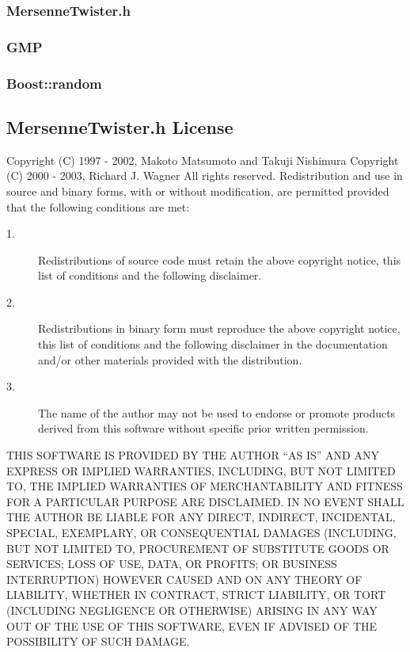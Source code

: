 \documentclass{scrartcl}
\begin{document}
\subsubsection{MersenneTwister.h}
\subsubsection{GMP}
\subsubsection{Boost::random}

\newpage
\begin{appendix}
\section{MersenneTwister.h License}
Copyright (C) 1997 - 2002, Makoto Matsumoto and Takuji Nishimura\newline
Copyright (C) 2000 - 2003, Richard J. Wagner\newline
All rights reserved.\newline
\newline
Redistribution and use in source and binary forms, with or without
modification, are permitted provided that the following conditions
are met:\newline
\begin{description}
\item[1.] Redistributions of source code must retain the above copyright\newline
   notice, this list of conditions and the following disclaimer.
\item[2.] Redistributions in binary form must reproduce the above copyright\newline
   notice, this list of conditions and the following disclaimer in the
   documentation and/or other materials provided with the distribution.
\item[3.] The name of the author may not be used to endorse or promote products
   derived from this software without specific prior written permission.\newline\newline
\end{description}

THIS SOFTWARE IS PROVIDED BY THE AUTHOR ``AS IS'' AND ANY EXPRESS OR
IMPLIED WARRANTIES, INCLUDING, BUT NOT LIMITED TO, THE IMPLIED WARRANTIES
OF MERCHANTABILITY AND FITNESS FOR A PARTICULAR PURPOSE ARE DISCLAIMED.
IN NO EVENT SHALL THE AUTHOR BE LIABLE FOR ANY DIRECT, INDIRECT,
INCIDENTAL, SPECIAL, EXEMPLARY, OR CONSEQUENTIAL DAMAGES (INCLUDING, BUT
NOT LIMITED TO, PROCUREMENT OF SUBSTITUTE GOODS OR SERVICES; LOSS OF USE,
DATA, OR PROFITS; OR BUSINESS INTERRUPTION) HOWEVER CAUSED AND ON ANY
THEORY OF LIABILITY, WHETHER IN CONTRACT, STRICT LIABILITY, OR TORT
(INCLUDING NEGLIGENCE OR OTHERWISE) ARISING IN ANY WAY OUT OF THE USE OF
THIS SOFTWARE, EVEN IF ADVISED OF THE POSSIBILITY OF SUCH DAMAGE.
\newpage

\end{appendix}
\end{document}
